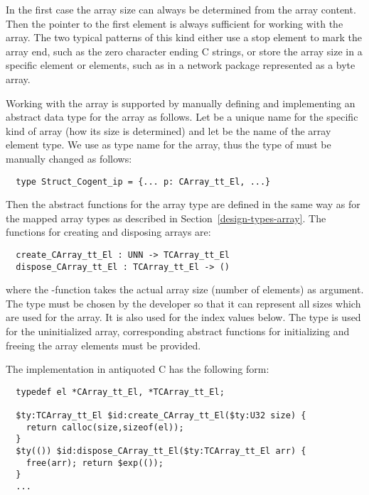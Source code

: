 In the first case the array size can always be determined from the array content. Then the pointer to the first 
element is always sufficient for working with the array. The two typical patterns of this kind either use a 
stop element to mark the array end, such as the zero character ending C strings, or store the array size in a
specific element or elements, such as in a network package represented as a byte array.

Working with the array is supported by manually defining and implementing an abstract data type for the array as follows.
Let  be a unique name for the specific kind of array (how its size is determined) and let  be the
name of the array element type. We use  as type name for the array, thus the 
type of  must be manually changed as follows:
\begin{verbatim}
  type Struct_Cogent_ip = {... p: CArray_tt_El, ...}
\end{verbatim}

Then the abstract functions for the array type are defined in the same way as for the mapped array types as described in
Section~\ref{design-types-array}. The functions for creating and disposing arrays are:
\begin{verbatim}
  create_CArray_tt_El : UNN -> TCArray_tt_El
  dispose_CArray_tt_El : TCArray_tt_El -> ()
\end{verbatim}
where the -function takes the actual array size (number of elements) as argument. The type  must be
chosen by the developer so that it can represent all sizes which are used for the array. It is also used for the index
values below. The type 
 is used for the uninitialized array, corresponding abstract functions for initializing
and freeing the array elements must be provided.

The implementation in antiquoted C has the following form:
\begin{verbatim}
  typedef el *CArray_tt_El, *TCArray_tt_El;
  
  $ty:TCArray_tt_El $id:create_CArray_tt_El($ty:U32 size) { 
    return calloc(size,sizeof(el));
  }
  $ty(()) $id:dispose_CArray_tt_El($ty:TCArray_tt_El arr) {
    free(arr); return $exp(());
  }
  ...
\end{verbatim}

